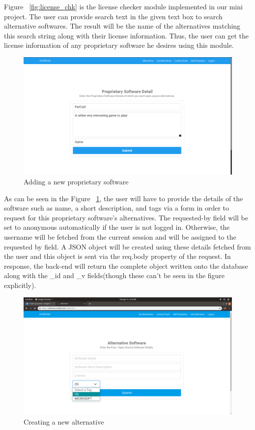 Figure ~\ref{fig:license_chk} is the license checker module implemented in our mini project. The user can provide search text in the given text box to search alternative softwares. The result will be the name of the alternatives matching this search string along with their license information. Thus, the user can get the license information of any proprietary software he desires using this module.

\begin{figure}[h!]
\includegraphics[scale=0.285]{images/4-6.png}
\caption{Adding a new proprietary software}
\label{fig:add_new_prop_sw}
\end{figure}

As can be seen in the Figure ~\ref{fig:add_new_prop_sw}, the user will have to provide the details of the software such as name, a short description, and tags via a form in order to request for this proprietary software's alternatives. The requested-by field will be set to anonymous automatically if the user is not logged in. Otherwise, the username will be fetched from the current session and will be assigned to the requested by field. A JSON object will be created using these details fetched from the user and this object is sent via the req.body property of the request. In response, the back-end will return the complete object written onto the database along with the \_id and \_v fields(though these can't be seen in the figure explicitly).


\begin{figure}[h!]
\includegraphics[scale=0.285]{images/4-7.png}
\caption{Creating a new alternative}
\label{fig:create_new_alt}
\end{figure}


